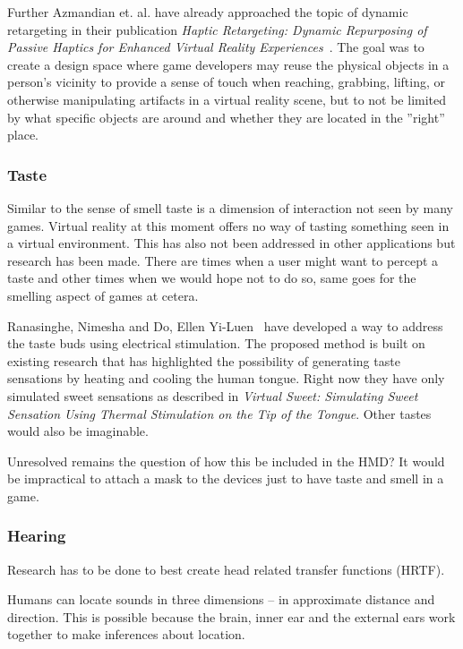 Further Azmandian et. al. have already approached the topic of dynamic retargeting in their publication \textit{Haptic Retargeting: Dynamic Repurposing of Passive Haptics for Enhanced Virtual Reality Experiences}~\cite{Azmandian:2016:HRD:2858036.2858226}. The goal was to create a design space where game developers may reuse the physical objects in a person’s vicinity to provide a sense of touch when reaching, grabbing, lifting, or otherwise manipulating artifacts in a virtual reality scene, but to not be limited by what specific objects are around and whether they are located in the ''right'' place.

\subsubsection{Taste}
Similar to the sense of smell taste is a dimension of interaction not seen by many games. Virtual reality at this moment offers no way of tasting something seen in a virtual environment. This has also not been addressed in other applications but research has been made. There are times when a user might want to percept a taste and other times when we would hope not to do so, same goes for the smelling aspect of games at cetera.

Ranasinghe, Nimesha and Do, Ellen Yi-Luen~\cite{Ranasinghe:2016:VSS:2984751.2985729} have developed a way to address the taste buds using electrical stimulation. The proposed method is built on existing research that has highlighted the possibility of generating taste sensations by heating and cooling the human tongue. Right now they have only simulated sweet sensations as described in \textit{Virtual Sweet: Simulating Sweet Sensation Using Thermal	Stimulation on the Tip of the Tongue}. Other tastes would also be imaginable.

Unresolved remains the question of how this be included in the HMD? It would be impractical to attach a mask to the devices just to have taste and smell in a game.

\subsubsection{Hearing}

Research has to be done to best create head related transfer functions (HRTF). 

Humans can locate sounds in three dimensions – in approximate distance and direction. This is possible because the brain, inner ear and the external ears work together to make inferences about location.

